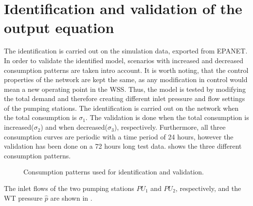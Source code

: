 \section{Identification and validation of the output equation}
\label{identification_and_validation_of_the_output_eq} 

The identification is carried out on the simulation data, exported from EPANET. In order to validate the identified model, scenarios with increased and decreased consumption patterns are taken intro account. It is worth noting, that the control properties of the network are kept the same, as any modification in control would mean a new operating point in the WSS. Thus, the model is tested by modifying the total demand and therefore creating different inlet pressure and flow settings of the pumping stations. The identification is carried out on the network when the total consumption is $\sigma_1$. The validation is done when the total consumption is increased($\sigma_2$) and when decreased($\sigma_3$), respectively. Furthermore, all three consumption curves are periodic with a time period of 24 hours, however the validation has been done on a 72 hours long test data.  shows the three different consumption patterns.

 \begin{figure}[H]
 \centering
  
 \vspace{-2.5mm}
 \caption{Consumption patterns used for identification and validation.}
 \label{fig:sigma123}
 \end{figure}

 \vspace{-3mm}

 The inlet flows of the two pumping stations $PU_1$ and $PU_2$, respectively, and the WT pressure $\hat{p}$ are shown in . 

 \vspace{-3mm}

 \begin{figure}[H]
 \centering
  
 \vspace{-2.5mm}
 \label{fig:dk_sigma1}
 \end{figure}


